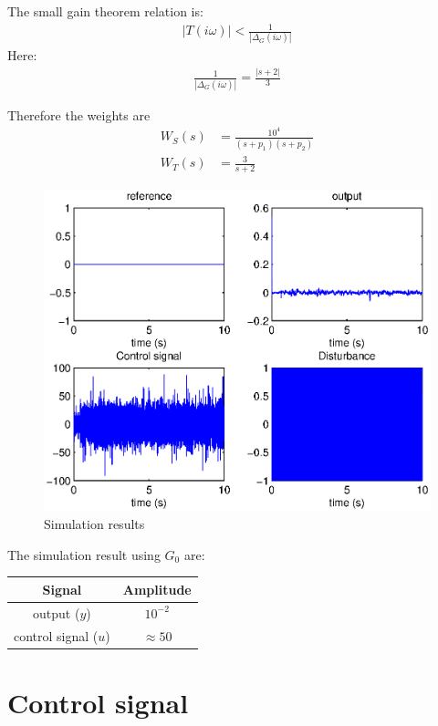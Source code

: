 \documentclass[a4paper,11pt]{article}
\begin{document}
    The small gain theorem relation is:
    \begin{align*}
        |T(i\omega)| < \frac{1}{|\Delta_G(i\omega)|}
    \end{align*}
    Here:
    \begin{align*}
        \frac{1}{|\Delta_G(i\omega)|} = \frac{|s+2|}{3}
    \end{align*}

	Therefore the weights are
	\begin{align*}
        W_S(s) & = \frac{10^{4}}{(s+p_1)(s+p_2)}  \\
        W_T(s) & = \frac{3}{s+2}
	\end{align*}

    \begin{figure}[h!b]
        \centering
        \includegraphics[width=.75\columnwidth]{fig/figure2.eps}
        \caption{Simulation results}
    \end{figure}

    The simulation result using $G_0$ are:
    
    \begin{center}
        \begin{tabular}{|c|c|}
        \hline
        \textbf{Signal} & \textbf{Amplitude} \\
        \hline
        output ($y$) & $10^{-2}$ \\
        \hline
        control signal ($u$) & $\approx 50$ \\
        \hline
        \end{tabular}
    \end{center}

	\section*{Control signal}
\end{document}
